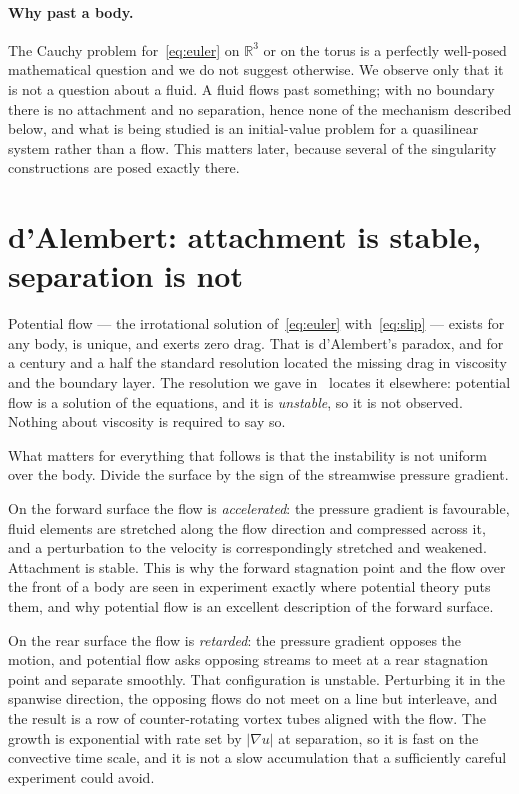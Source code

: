 \documentclass[11pt]{article}
\newcommand{\grad}{\nabla}
\begin{document}
\paragraph{Why past a body.} The Cauchy problem for~\eqref{eq:euler} on $\mathbb{R}^3$ or on the
torus is a perfectly well-posed mathematical question and we do not suggest otherwise. We observe
only that it is not a question about a fluid. A fluid flows past something; with no boundary there
is no attachment and no separation, hence none of the mechanism described below, and what is being
studied is an initial-value problem for a quasilinear system rather than a flow. This matters later,
because several of the singularity constructions are posed exactly there.

\section{d'Alembert: attachment is stable, separation is not}\label{sec:dalembert}

Potential flow --- the irrotational solution of~\eqref{eq:euler} with~\eqref{eq:slip} --- exists for
any body, is unique, and exerts zero drag. That is d'Alembert's paradox, and for a century and a
half the standard resolution located the missing drag in viscosity and the boundary layer. The
resolution we gave in~\cite{dalembert} locates it elsewhere: potential flow is a solution of the
equations, and it is \emph{unstable}, so it is not observed. Nothing about viscosity is required to
say so.

What matters for everything that follows is that the instability is not uniform over the body.
Divide the surface by the sign of the streamwise pressure gradient.

On the forward surface the flow is \emph{accelerated}: the pressure gradient is favourable, fluid
elements are stretched along the flow direction and compressed across it, and a perturbation to the
velocity is correspondingly stretched and weakened. Attachment is stable. This is why the forward
stagnation point and the flow over the front of a body are seen in experiment exactly where
potential theory puts them, and why potential flow is an excellent description of the forward
surface.

On the rear surface the flow is \emph{retarded}: the pressure gradient opposes the motion, and
potential flow asks opposing streams to meet at a rear stagnation point and separate smoothly. That
configuration is unstable. Perturbing it in the spanwise direction, the opposing flows do not meet
on a line but interleave, and the result is a row of counter-rotating vortex tubes aligned with the
flow. The growth is exponential with rate set by $|\grad u|$ at separation, so it is fast on the
convective time scale, and it is not a slow accumulation that a sufficiently careful experiment
could avoid.
\end{document}
